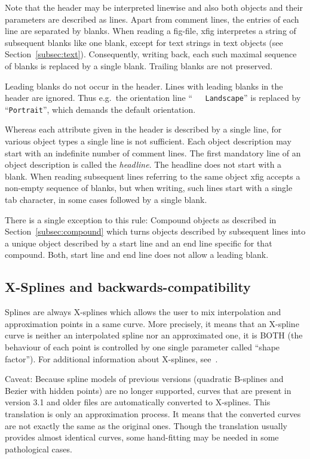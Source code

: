 \documentclass[10pt, a4paper]{article}
\begin{document}
Note that the header may be interpreted linewise 
and also both objects and their parameters are described as lines. 
Apart from comment lines, the entries of each line are separated by blanks. 
When reading a fig-file, 
xfig interpretes a string of subsequent blanks like one blank, 
except for text strings in text objects (see Section~\ref{subsec:text}). 
Consequently, writing back, each such maximal sequence of blanks 
is replaced by a single blank. 
Trailing blanks are not preserved. 

Leading blanks do not occur in the header. 
Lines with leading blanks in the header are ignored. 
Thus e.g.~the orientation line 
``\texttt{\ \ \ Landscape}'' is replaced by ``\texttt{Portrait}'', 
which demands the default orientation. 

Whereas each attribute given in the header is described by a single line, 
for various object types a single line is not sufficient. 
Each object description may start with an indefinite number of comment lines. 
The first mandatory line of an object description is called the {\em headline}. 
The headline does not start with a blank. 
When reading subsequent lines referring to the same object 
xfig accepts a non-empty sequence of blanks, 
but when writing, such lines start with a single tab character, 
in some cases followed by a single blank. 

There is a single exception to this rule: 
Compound objects as described in Section~\ref{subsec:compound} 
which turns objects described by subsequent lines 
into a unique object described by a 
start line and an end line specific for that compound. 
Both, start line and end line does not allow a leading blank. 


\subsection{X-Splines and backwards-compatibility}

Splines are always X-splines 
which allows the user to mix interpolation and approximation 
points in a same curve. 
More precisely, it means that an X-spline curve 
is neither an interpolated spline nor an approximated one, 
it is BOTH (the behaviour of each point 
is controlled by one single parameter called ``shape factor''). 
For additional information about X-splines, see~\cite{XSpline}. 

Caveat: Because spline models of previous versions 
(quadratic B-splines and Bezier with hidden points) 
are no longer supported, 
curves that are present in version 3.1 and older files 
are automatically converted to X-splines. 
This translation is only an approximation process. 
It means that the converted curves 
are not exactly the same as the original ones. 
Though the translation usually provides almost identical curves, 
some hand-fitting may be needed in some pathological cases. 
\end{document}
